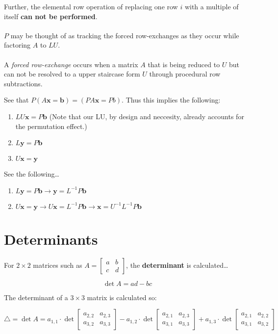 \documentclass[12pt]{article}
\newcommand{\bm}[1]{\mathbf{{#1}}}
\newcommand{\mb}{\begin{bmatrix}}
\newcommand{\me}{\end{bmatrix}}
\begin{document}
Further, the elemental row operation of replacing one row $i$ with a multiple of itself \textbf{can not be performed}. \\ \\

$P$ may be thought of as tracking the forced row-exchanges as they occur while factoring $A$ to $LU$. \\ \\

A \emph{forced row-exchange} occurs when a matrix $A$ that is being reduced to $U$ but can not be resolved to a upper staircase
form $U$ through procedural row subtractions.

See that $P(A\bm{x} = \bm{b}) = (PA\bm{x} = Pb)$. Thus this implies the following:

\begin{enumerate}
    \item $LU\bm{x} = P\bm{b}$ (Note that our LU, by design and neccesity, already accounts for the permutation effect.)
    \item $L\bm{y} = P\bm{b}$
    \item $U\bm{x} = \bm{y}$
\end{enumerate}

See the following\dots

\begin{enumerate}
    \item $L\bm{y} = P\bm{b} \rightarrow \bm{y} = L^{-1}P\bm{b}$
    \item $U\bm{x} = \bm{y} \rightarrow U\bm{x} = L^{-1}P\bm{b} \rightarrow \bm{x} = U^{-1}L^{-1}P\bm{b}$
\end{enumerate}

\section*{Determinants}

For $2\times 2$ matrices such as $A = \mb a & b \\ c & d\me$, the \textbf{determinant} is calculated\dots

$$\det A = ad-bc$$

The determinant of a $3\times 3$ matrix is calculated so:

$$\triangle = \det A = a_{1,1} \cdot \det \mb a_{2,2} & a_{2,3} \\ a_{3,2} & a_{3,3} \me
- a_{1,2} \cdot \det \mb a_{2,1} & a_{2,3} \\ a_{3,1} & a_{3,3} \me
+ a_{1,3} \cdot \det \mb a_{2,1} & a_{2,2} \\ a_{3,1} & a_{3,2} \me$$
\end{document}
